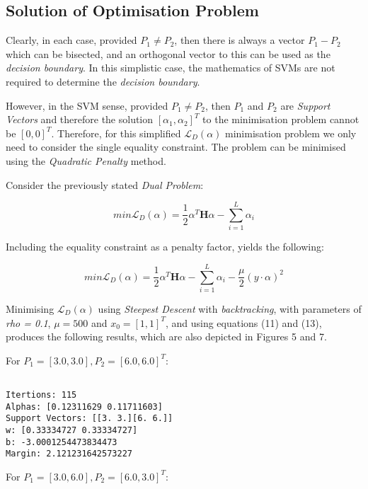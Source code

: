 \documentclass[10pt, a4paper,reqno]{amsart}
\begin{document}
\subsection{Solution of Optimisation Problem}

Clearly, in each case, provided $P_1 \neq P_2$, then there is always a vector $P_1 - P_2$ which can be bisected, and an orthogonal vector to this can be used as the \emph{decision boundary}. In this simplistic case, the mathematics of SVMs are not required to determine the \emph{decision boundary}. 

However, in the SVM sense, provided $P_1 \neq P_2$, then $P_1$ and $P_2$ are \emph{Support Vectors} and therefore the solution $[\alpha_1, \alpha_2]^T$ to the minimisation problem cannot be $[0, 0]^T$. Therefore, for this simplified $\mathcal{L}_D(\alpha)$ minimisation problem we only need to consider the single equality constraint. The problem can be minimised using the \emph{Quadratic Penalty} method.

Consider the previously stated \emph{Dual Problem}:

\begin{equation}
min\mathcal{L}_D(\alpha) = \frac{1}{2}\alpha^T\mathbf{H}\alpha - \sum_{i=1}^{L}\alpha_i
\end{equation}

Including the equality constraint as a penalty factor, yields the following:

\begin{equation}
min\mathcal{L}_D(\alpha) = \frac{1}{2}\alpha^T\mathbf{H}\alpha - \sum_{i=1}^{L}\alpha_i - \frac{\mu}{2}(y\cdot\alpha)^2
\end{equation}

Minimising $\mathcal{L}_D(\alpha)$ using \emph{Steepest Descent} with \emph{backtracking}, with parameters of \emph{rho = 0.1}, $\mu = 500$ and $x_0 = [1, 1]^T$, and using equations (11) and (13), produces the following results, which are also depicted in Figures 5 and 7.

For $P_1 = [3.0, 3.0], P_2 = [6.0, 6.0]^T$:

\begin{verbatim}

Itertions: 115
Alphas: [0.12311629 0.11711603]
Support Vectors: [[3. 3.][6. 6.]]
w: [0.33334727 0.33334727]
b: -3.0001254473834473
Margin: 2.121231642573227

\end{verbatim}

For $P_1 = [3.0, 6.0], P_2 = [6.0, 3.0]^T$:
\end{document}
